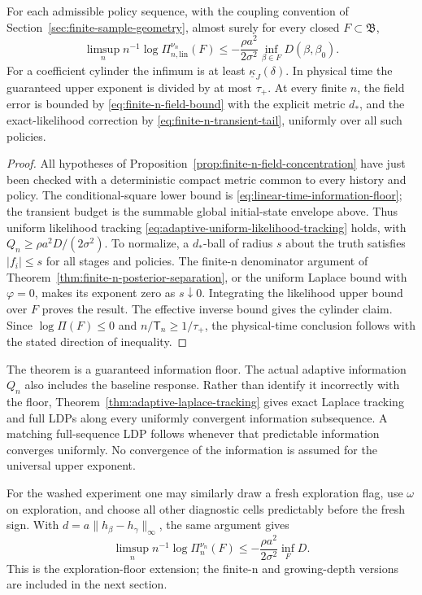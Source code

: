 \begin{theorem}
\label{thm:linear-time-adaptive-jacobi}
For each admissible policy sequence, with the coupling convention of
Section~\ref{sec:finite-sample-geometry}, almost surely for every closed
\(F\subset\mathfrak B\),
\begin{equation}
 \limsup_n n^{-1}\log\Pi_{n,\mathrm{lin}}^{\nu_n}(F)
 \le-\frac{\rho a^2}{2\sigma^2}\inf_{\beta\in F}D(\beta,\beta_0).
 \label{eq:linear-posterior-upper}
\end{equation}
For a coefficient cylinder the infimum is at least
\(\underline\kappa_J(\delta)\). In physical time the guaranteed upper
exponent is divided by at most \(\tau_+\). At every finite \(n\), the
field error is bounded by \eqref{eq:finite-n-field-bound} with the explicit
metric \(d_*\), and the exact-likelihood correction by
\eqref{eq:finite-n-transient-tail}, uniformly over all such policies.
\end{theorem}
\begin{proof}
All hypotheses of Proposition~\ref{prop:finite-n-field-concentration} have
just been checked with a deterministic compact metric common to every
history and policy. The conditional-square lower bound is
\eqref{eq:linear-time-information-floor}; the transient budget is the
summable global initial-state envelope above. Thus uniform likelihood
tracking \eqref{eq:adaptive-uniform-likelihood-tracking} holds, with
\(Q_n\ge\rho a^2D/(2\sigma^2)\).
To normalize, a \(d_*\)-ball of radius \(s\) about the truth satisfies
\(|f_i|\le s\) for all stages and policies. The finite-n denominator
argument of Theorem~\ref{thm:finite-n-posterior-separation}, or the uniform
Laplace bound with \(\varphi=0\), makes its exponent zero as
\(s\downarrow0\). Integrating the likelihood upper bound over \(F\)
proves the result. The effective inverse bound gives the cylinder claim.
Since \(\log\Pi(F)\le0\) and \(n/\mathsf T_n\ge1/\tau_+\), the
physical-time conclusion follows with the stated direction of inequality.
\end{proof}

The theorem is a guaranteed information floor. The actual adaptive
information \(Q_n\) also includes the baseline response. Rather than
identify it incorrectly with the floor, Theorem~\ref{thm:adaptive-laplace-tracking}
gives exact Laplace tracking and full LDPs along every uniformly convergent
information subsequence. A matching full-sequence LDP follows whenever
that predictable information converges uniformly. No convergence of the
information is assumed for the universal upper exponent.

For the washed experiment one may similarly draw a fresh exploration flag,
use \(\omega\) on exploration, and choose all other diagnostic cells
predictably before the fresh sign. With \(d=a\|h_\beta-h_\gamma\|_\infty\),
the same argument gives
\begin{equation}
 \limsup_n n^{-1}\log\Pi_n^{\nu_n}(F)
 \le-\frac{\rho a^2}{2\sigma^2}\inf_F D.
 \label{eq:adaptive-exploration-rate}
\end{equation}
This is the exploration-floor extension; the finite-n and growing-depth
versions are included in the next section.
